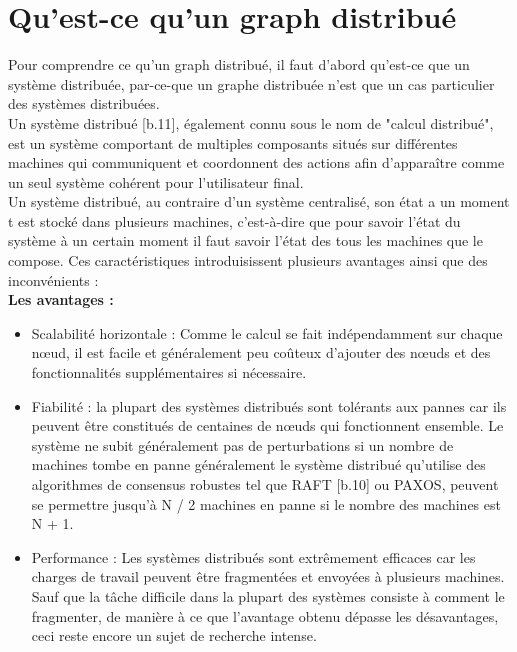\section{Qu’est-ce qu’un graph distribué}
Pour comprendre ce qu’un graph distribué, il faut d’abord qu’est-ce que un système distribuée, par-ce-que un graphe distribuée n’est que un cas particulier des systèmes distribuées.\\
Un système distribué [b.11], également connu sous le nom de "calcul distribué", est un système comportant de multiples composants situés sur différentes machines qui communiquent et coordonnent des actions afin d'apparaître comme un seul système cohérent pour l'utilisateur final.\\
Un système distribué, au contraire d’un système centralisé, son état a un moment t est stocké dans plusieurs machines, c’est-à-dire que pour savoir l’état du système à un certain moment il faut savoir l’état des tous les machines que le compose. Ces caractéristiques introduisissent plusieurs avantages ainsi que des inconvénients :\\

\textbf{Les avantages :}
\begin{itemize}[label=\textbullet]
\item  Scalabilité horizontale : Comme le calcul se fait indépendamment sur chaque nœud, il est facile et généralement peu coûteux d'ajouter des nœuds et des fonctionnalités supplémentaires si nécessaire.\\
\item  Fiabilité : la plupart des systèmes distribués sont tolérants aux pannes car ils peuvent être constitués de centaines de nœuds qui fonctionnent ensemble. Le système ne subit généralement pas de perturbations si un nombre de machines tombe en panne généralement le système distribué qu’utilise des algorithmes de consensus robustes tel que RAFT [b.10] ou PAXOS, peuvent se permettre jusqu’à N / 2 machines en panne si le nombre des machines est N + 1.
\item  Performance : Les systèmes distribués sont extrêmement efficaces car les charges de travail peuvent être fragmentées et envoyées à plusieurs machines. Sauf que la tâche difficile dans la plupart des systèmes consiste à comment le fragmenter, de manière à ce que l’avantage obtenu dépasse les désavantages, ceci reste encore un sujet de recherche intense.
\end{itemize}


